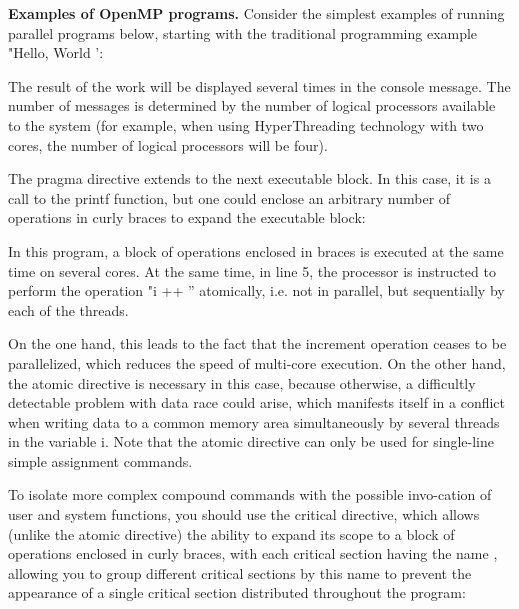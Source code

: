 {	\par\textbf{Examples of OpenMP programs.} Consider the simplest examples of running parallel programs below, starting with the traditional programming example "Hello, World ':
	\begin{figure}[H]
		
	\end{figure}
	\par The result of the work will be displayed several times in the console message. The number of messages is determined by the number of logical processors available to the system (for example, when using HyperThreading technology with two cores, the number of logical processors will be four). 
	\par The pragma directive extends to the next executable block. In this case, it is a call to the printf function, but one could enclose an arbitrary number of operations in curly braces to expand the executable block:
	\begin{figure}[H]
		
	\end{figure}
	In this program, a block of operations enclosed in braces is executed at the same time on several cores. At the same time, in line 5, the processor is instructed to perform the operation "i ++ '' atomically, i.e. not in parallel, but sequentially by each of the threads.
	\par On the one hand, this leads to the fact that the increment operation ceases to be parallelized, which reduces the speed of multi-core execution. On the other hand, the atomic directive is necessary in this case, because otherwise, a difficultly detectable problem with data race could arise, which manifests itself in a conflict when writing data to a common memory area simultaneously by several threads in the variable i. Note that the atomic directive can only be used for single-line simple assignment commands.
	\par To isolate more complex compound commands with the possible invo-cation of user and system functions, you should use the critical directive, which allows (unlike the atomic directive) the ability to expand its scope to a block of operations enclosed in curly braces, with each critical section having the name , allowing you to group different critical sections by this name to prevent the appearance of a single critical section distributed throughout the program:
	\begin{figure}[H]
		
	\end{figure}
}
